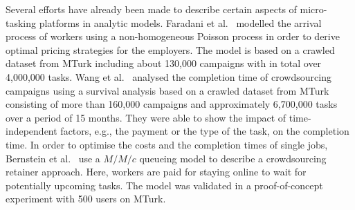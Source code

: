 Several efforts have already been made to describe certain aspects of micro-tasking platforms in analytic models. 
Faradani et al.~\cite{Faradani2011} modelled the arrival process of workers using a non-homogeneous Poisson process in order to derive optimal pricing strategies for the employers.
The model is based on a crawled dataset from MTurk including about 130,000 campaigns with in total over 4,000,000 tasks.
Wang et al.~\cite{Wang2011} analysed the completion time of crowdsourcing campaigns using a survival analysis based on a crawled dataset from MTurk consisting of more than 160,000 campaigns and approximately 6,700,000 tasks over a period of 15 months.
They were able to show the impact of time-independent factors, e.g., the payment or the type of the task, on the completion time.
In order to optimise the costs and the completion times of single jobs, Bernstein et al.~\cite{Bernstein2012} use a \(M/M/c\) queueing model to describe a crowdsourcing retainer approach.
Here, workers are paid for staying online to wait for potentially upcoming tasks.
The model was validated in a proof-of-concept experiment with 500 users on MTurk.
